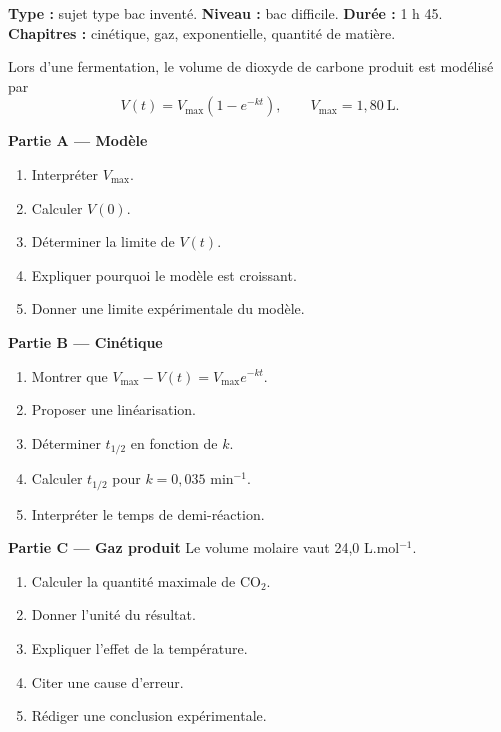 \documentclass[11pt,a4paper]{article}
\begin{document}
\hypertarget{PC-LONG-03}{}
\begin{sujettype}
\textbf{Type :} sujet type bac inventé.  
\textbf{Niveau :} bac difficile.  
\textbf{Durée :} 1 h 45.  
\textbf{Chapitres :} cinétique, gaz, exponentielle, quantité de matière.

Lors d'une fermentation, le volume de dioxyde de carbone produit est modélisé par
\[
V(t)=V_{\max}(1-e^{-kt}),\qquad V_{\max}=1{,}80\ \text{L}.
\]

\textbf{Partie A — Modèle}
\begin{enumerate}
  \item Interpréter $V_{\max}$.
  \item Calculer $V(0)$.
  \item Déterminer la limite de $V(t)$.
  \item Expliquer pourquoi le modèle est croissant.
  \item Donner une limite expérimentale du modèle.
\end{enumerate}

\textbf{Partie B — Cinétique}
\begin{enumerate}
  \item Montrer que $V_{\max}-V(t)=V_{\max}e^{-kt}$.
  \item Proposer une linéarisation.
  \item Déterminer $t_{1/2}$ en fonction de $k$.
  \item Calculer $t_{1/2}$ pour $k=0{,}035$ min$^{-1}$.
  \item Interpréter le temps de demi-réaction.
\end{enumerate}

\textbf{Partie C — Gaz produit}
Le volume molaire vaut 24,0 L.mol$^{-1}$.
\begin{enumerate}
  \item Calculer la quantité maximale de CO$_2$.
  \item Donner l'unité du résultat.
  \item Expliquer l'effet de la température.
  \item Citer une cause d'erreur.
  \item Rédiger une conclusion expérimentale.
\end{enumerate}
\end{sujettype}
\end{document}
